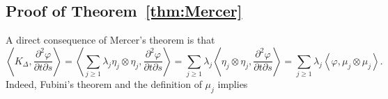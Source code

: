 \documentclass[aos]{imsart}
\theoremstyle{plain}
\theoremstyle{remark}
\newcommand{\vinc}[1]{\textcolor[rgb]{1,0,1}{\textsf{[V: #1]}}}
\newcommand{\1}{1}
\begin{document}
\subsection{Proof of Theorem~\ref{thm:Mercer}}


A direct consequence of Mercer's theorem is that
\[
\left\langle K_\Delta, \frac{\partial^2 \varphi}{\partial t\partial s}\right\rangle = \left\langle \sum_{j\geq 1}\lambda_j\eta_j\otimes\eta_j, \frac{\partial^2 \varphi}{\partial t\partial s}\right\rangle =\sum_{j\geq 1}\lambda_j \left\langle \eta_j\otimes\eta_j, \frac{\partial^2 \varphi}{\partial t\partial s}\right\rangle=\sum_{j\geq 1}\lambda_j \left\langle \varphi, \mu_j\otimes\mu_j\right\rangle. 
\]
Indeed,  Fubini's theorem and the definition of $\mu_j$ implies 
\end{document}

